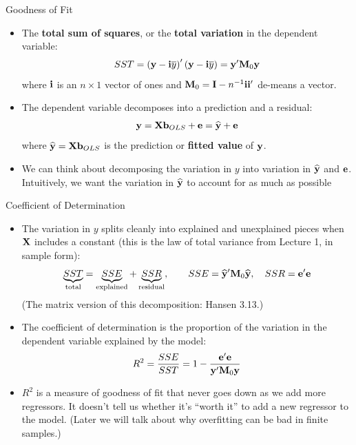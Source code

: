 \documentclass[aspectratio=169,11pt]{beamer}
\begin{document}
\begin{frame}{Goodness of Fit}
\begin{itemize}
	\item The {\bf total sum of squares}, or the {\bf total variation} in the dependent variable:\[
	SST = \left({\bf y} - {\bf i} \overline{y} \right)' \left({\bf y} - {\bf i} \overline{y} \right) = {\bf y}'{\bf M}_{0}{\bf y}
	\]
	where ${\bf i}$ is an $n\times 1$ vector of ones and ${\bf M}_{0} = {\bf I} - n^{-1}{\bf i}{\bf i}'$ de-means a vector.

	\smallskip
	\item The dependent variable decomposes into a prediction and a residual:\[
	{\bf y} = {\bf X} {\bf b}_{OLS} + {\bf e} =  \widehat{{\bf y}} + {\bf e}
	\]
where $\widehat{{\bf y}} = {\bf X} {\bf b}_{OLS}$ is the prediction or {\bf fitted value} of ${\bf y}$. 

	\smallskip
	\item We can think about decomposing the variation in $y$ into variation in $ \widehat{{\bf y}}$ and ${\bf e}$.
	Intuitively, we want the variation in  $ \widehat{{\bf y}}$ to account for as much as possible
\end{itemize}
\end{frame}



\begin{frame}{Coefficient of Determination}
\begin{itemize}
	\item The variation in $y$ splits cleanly into explained and unexplained pieces
	when ${\bf X}$ includes a constant
	(this is the \alert{law of total variance} from Lecture 1, in sample form):\[
	\underbrace{SST}_{\text{total}} = \underbrace{SSE}_{\text{explained}} + \underbrace{SSR}_{\text{residual}},
	\qquad SSE = \widehat{{\bf y}}'{\bf M}_{0}\widehat{{\bf y}}, \quad SSR = {\bf e}'{\bf e}
	\]
	(The matrix version of this decomposition: Hansen 3.13.)

	\smallskip
	\item The coefficient of determination is the proportion of the variation in the dependent variable
	explained by the model:\[
	R^{2} = \frac{SSE}{SST}
	= 1 -  \frac{{\bf e}'{\bf e}}{{\bf y}'{\bf M}_{0}{\bf y}}
\]

	\smallskip
	\item $R^{2}$ is a measure of goodness of fit that never goes down as we add more regressors. It doesn't 
	tell us whether it's ``worth it'' to add a new regressor to the model. (Later we will talk about why overfitting
	can be bad in finite samples.)
\end{itemize}
\end{frame}
\end{document}
